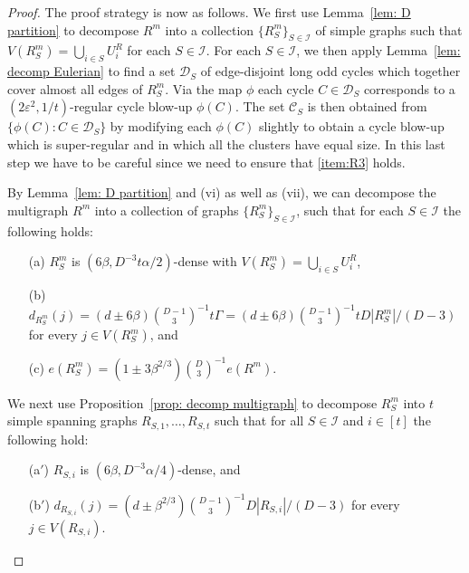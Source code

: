 \documentclass[a4paper, 11pt, reqno]{amsart}
\numberwithin{equation}{section}
\newcommand{\1}{{\rm 1\hspace*{-0.4ex}%
\rule{0.1ex}{1.52ex}\hspace*{0.2ex}}}
\newcommand{\cC}{\mathcal{C}}
\newcommand{\cD}{\mathcal{D}}
\newcommand{\cI}{\mathcal{I}}
\renewcommand{\epsilon}{\varepsilon}
\newcounter{step}
\begin{document}
\begin{proof}
The proof strategy is now as follows.
We first use Lemma~\ref{lem: D partition} to decompose $R^m$ into a collection $\{R_S^m\}_{S\in \cI}$ of simple graphs such that 
$V(R^m_S)=\bigcup_{i\in S}U_i^R$ for each $S\in \cI$.
For each $S\in \cI$,
we then apply Lemma~\ref{lem: decomp Eulerian} to find a set $\cD_S$ of edge-disjoint long odd cycles which together cover almost all edges of $R^m_S$.
Via the map $\phi$ each cycle $C\in \cD_S$ corresponds to a $(2\epsilon^2,1/t)$-regular cycle blow-up $\phi(C)$.
The set $\cC_S$ is then obtained from $\{\phi(C):C\in \cD_S\}$ by modifying each $\phi(C)$ slightly to obtain a cycle blow-up which is super-regular
and in which all the clusters have equal size.
In this last step we have to be careful
since we need to ensure that \ref{item:R3} holds.

By Lemma~\ref{lem: D partition} and (vi) as well as (vii), 
we can decompose the multigraph $R^m$ into a collection of graphs $\{R^m_S\}_{S\in \cI}$,
such that for each $S\in \cI$ the following holds:
\begin{itemize}
\item[(a)] $R^m_S$ is  $(6\beta, D^{-3}t\alpha/2)$-dense with $V(R^m_S)=\bigcup_{i\in S} U_i^R$,
\item[(b)] $d_{R^m_S}(j) =  (d\pm 6\beta)\binom{D-1}{3}^{-1}t\Gamma= (d\pm 6\beta)\binom{D-1}{3}^{-1}tD |R_S^m|/(D-3)$
for every $j\in V(R^m_S)$, and
\item[(c)] $e(R^m_S)=(1\pm 3\beta^{2/3})\binom{D}{3}^{-1}e(R^m)$.
\end{itemize}

We next use Proposition~\ref{prop: decomp multigraph} to decompose $R^m_S$ into $t$ simple spanning graphs $R_{S,1},\ldots,R_{S,t}$
such that for all $S\in \cI$ and $i\in[t]$ the following hold:
\begin{itemize}
\item[(a$'$)] $R_{S,i}$ is $(6\beta,D^{-3}\alpha/4)$-dense, and
\item[(b$'$)] $d_{R_{S,i}}(j)=(d\pm \beta^{2/3})\binom{D-1}{3}^{-1}D|R_{S,i}|/(D-3)$ for every $j\in V(R_{S,i})$.
\end{itemize}



\end{proof}
\end{document}
